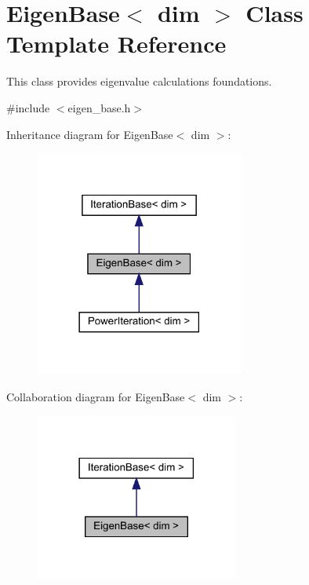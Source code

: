 \hypertarget{class_eigen_base}{}\section{Eigen\+Base$<$ dim $>$ Class Template Reference}
\label{class_eigen_base}


This class provides eigenvalue calculations foundations.  




{\ttfamily \#include $<$eigen\+\_\+base.\+h$>$}



Inheritance diagram for Eigen\+Base$<$ dim $>$\+:\nopagebreak
\begin{figure}[H]
\begin{center}
\leavevmode
\includegraphics[width=194pt]{class_eigen_base__inherit__graph}
\end{center}
\end{figure}


Collaboration diagram for Eigen\+Base$<$ dim $>$\+:\nopagebreak
\begin{figure}[H]
\begin{center}
\leavevmode
\includegraphics[width=189pt]{class_eigen_base__coll__graph}
\end{center}
\end{figure}
